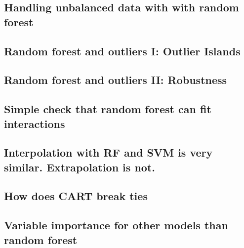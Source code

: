 \subsection{Handling unbalanced data with with random forest}
\label{CV1_classwt}



\subsection{Random forest and outliers I: Outlier Islands}

\label{CV2_fullygrown}

\subsection{Random forest and outliers II: Robustness}

\label{CV3_sensitiveOutliers}

\subsection{Simple check that random forest can fit interactions}

\label{CV4_assertInteraction}

\subsection{Interpolation with RF and SVM is very similar. Extrapolation is not.}

\label{CV5_SVM_RF_same_same}

\subsection{How does CART break ties}

\label{CV6_CARTtiebreak}

\subsection{Variable importance for other models than random forest}

\label{CV7_VIbeyondRF}

